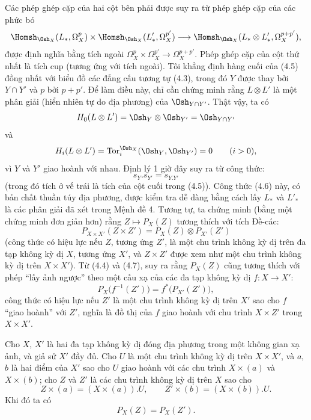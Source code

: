 Các phép ghép cặp của hai cột bên phải được suy ra từ phép ghép cặp của
các phức bó
\[
\Homsh_{\Osh_X}(L_{*},\Omega_X^{p})
\times\Homsh_{\Osh_X}(L'_{*},\Omega_X^{p'})
\longrightarrow
\Homsh_{\Osh_X}(L_{*}\otimes L'_{*},\Omega_X^{p+p'}),
\]
được định nghĩa bằng tích ngoài
$\Omega_X^{p}\times\Omega_X^{p'}\longrightarrow\Omega_X^{p+p'}$.
Phép ghép cặp của cột thứ nhất là tích cup (tương ứng với tích
ngoài). Tôi khẳng định hàng cuối của (4.5) đồng nhất với biểu đồ
các đẳng cấu tương tự (4.3), trong đó $Y$ được thay bởi $Y\cap Y'$ và $p$ bởi
$p+p'$. Để làm điều này, chỉ cần chứng minh rằng $L\otimes L'$ là một phân giải
(hiển nhiên tự do địa phương) của $\Osh_{Y\cap Y'}$. Thật vậy, ta có
\[
  H_0(L\otimes L')=\Osh_Y\otimes\Osh_{Y'}=\Osh_{Y\cap Y'}
\]
và
\[
  H_i(L\otimes L')=\operatorname{Tor}_{i}^{\Osh_X}(\Osh_Y,\Osh_{Y'})=0
  \qquad(i>0),
\]
vì $Y$ và $Y'$ giao hoành với nhau. Định lý 1 giờ đây suy ra
từ công thức:
\begin{equation}\tag{4.6}
  s_Y.s_{Y'}=s_{Y.Y'}
\end{equation}
(trong đó tích ở vế trái là tích của cột cuối trong (4.5)).
Công thức (4.6) này, có bản chất thuần túy địa phương, được kiểm tra dễ dàng
bằng cách lấy $L_{*}$ và $L'_{*}$ là các phân giải đã xét trong Mệnh đề
4. Tương tự, ta chứng minh (bằng một chứng minh đơn giản hơn) rằng
$Z\longmapsto P_X(Z)$ tương thích với tích Đề-các:
\begin{equation}\tag{4.7}
  P_{X\times X'}(Z\times Z')=P_X(Z)\otimes P_{X'}(Z')
\end{equation}
(công thức có hiệu lực nếu $Z$, tương ứng $Z'$, là một chu trình không kỳ dị trên đa tạp
không kỳ dị $X$, tương ứng $X'$, và $Z\times Z'$ được xem như một chu trình không
kỳ dị trên $X\times X'$). Từ (4.4) và (4.7), suy ra rằng $P_X(Z)$ cũng
tương thích với phép “lấy ảnh ngược” theo một cấu xạ của các đa tạp không
kỳ dị $f:X\longrightarrow X'$:
\begin{equation}\tag{4.8}
  P_X\bigl(f^{-1}(Z')\bigr)=f^{*}\bigl(P_{X'}(Z')\bigr),
\end{equation}
công thức có hiệu lực nếu $Z'$ là một chu trình không kỳ dị trên $X'$ sao cho $f$
“giao hoành” với $Z'$, nghĩa là đồ thị của $f$ giao hoành với chu trình
$X\times Z'$ trong $X\times X'$.

 Cho $X$, $X'$ là hai đa tạp không kỳ dị
đóng địa phương trong một không gian xạ ảnh, và giả sử $X'$ đầy đủ. Cho $U$
là một chu trình không kỳ dị trên $X\times X'$, và $a$, $b$ là hai điểm của $X'$ sao cho
$U$ giao hoành với các chu trình $X\times(a)$ và $X\times(b)$; cho $Z$
và $Z'$ là các chu trình không kỳ dị trên $X$ sao cho
\[
  Z\times(a)=(X\times(a)).U,
  \qquad
  Z'\times(b)=(X\times(b)).U.
\]
Khi đó ta có
\[
  P_X(Z)=P_X(Z').
\]

